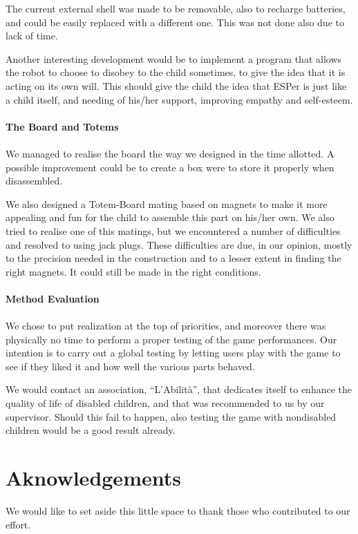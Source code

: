 \documentclass[a4paper,twoside]{book}
\begin{document}
The current external shell was made to be removable, also to recharge batteries, and could be easily replaced with a different one. This was not done also due to lack of time. 

Another interesting development would be to implement a program that allows the robot to choose to disobey to the child sometimes, to give the idea that it is acting on its own will. This should give the child the idea that ESPer is just like a child itself, and needing of his/her support, improving empathy and self-esteem.
\\
\\
\textbf{The Board and Totems}
\\
\\
We managed to realise the board the way we designed in the time allotted. A possible improvement could be to create a box were to store it properly when disassembled. 

We also designed a Totem-Board mating based on magnets to make it more appealing and fun for the child to assemble this part on his/her own. We also tried to realise one of this matings, but we encountered a number of difficulties and resolved to using jack plugs. These difficulties are due, in our opinion, mostly to the precision needed in the construction and  to a lesser extent in finding the right magnets. It could still be made in the right conditions.
\\
\\
\textbf{Method Evaluation}
\\
\\
We chose to put realization at the top of priorities, and moreover there was physically no time to perform a proper testing of the game performances. Our intention is to carry out a global testing by letting users play with the game to see if they liked it and how well the various parts behaved.

We would contact an association, \textquotedblleft L'Abilit\`{a}\textquotedblright , that dedicates itself to enhance the quality of life of disabled children, and that was recommended to us by our supervisor. Should this fail to happen, also testing the game with non\textendash disabled children would be a good result already.

\chapter{Aknowledgements}

We would like to set aside this little space to thank those who contributed to our effort.
\end{document}
